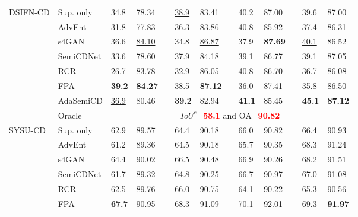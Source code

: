 \documentclass[lang=chs, degree=master, blindreview=false, adobe=false]{yanputhesis}
\begin{document}
\begin{table}[H]
{\begin{tabular}{p{20mm}p{25mm}p{8mm}p{8mm}cp{8mm}p{8mm}cp{8mm}p{8mm}cp{8mm}p{8mm}}
      \bottomrule
      \multirow{8}{*}{DSIFN-CD}
      & Sup. only   &   34.8 & 78.34 && \underline{38.9} & 83.41 && 40.2 & 87.00 && 39.6 & 87.00 \\ %
      & AdvEnt\cite{vu2019advent}& 31.8 & 77.83 && 36.3 & 83.86 && 40.8 & 85.92 && 37.4 & 86.31 \\ %
      & s4GAN\cite{mittal2019semi}& 36.6 & \underline{84.10} && 34.8 & \underline{86.87} && 37.9 & \cellcolor{mycyan}\textbf{87.69} && \underline{40.1} & 86.52 \\
      & SemiCDNet\cite{peng2021SemiCDNet} & 33.6 & 78.60 && 37.9 & 84.18 && 39.1 & 86.77 && 39.1 & \underline{87.05} \\ %
      & RCR\cite{bandara2022RCR}& 26.7 & 83.78 && 32.9 & 86.05 && 40.8 & 86.70 && 36.7 & 86.08 \\
      & FPA\cite{Zhang2023FPA}& \cellcolor{mycyan}\textbf{39.2} & \cellcolor{mycyan}\textbf{84.27} && 38.5 & \cellcolor{mycyan}\textbf{87.12} && 36.0 & \underline{87.41} && 35.8 & 86.50 \\
      \multirow{-8}{*}{\cellcolor{white}}& \cellcolor{white}AdaSemiCD   &   \cellcolor{white}\underline{36.9} & \cellcolor{white}80.46 && \cellcolor{mycyan}\textbf{39.2} & 82.94 && \cellcolor{mycyan}\textbf{41.1} & 85.45 && \cellcolor{mycyan}\textbf{45.1} & \cellcolor{mycyan}\textbf{87.12} \\%
      \cline{2-13}
      & Oracle & \multicolumn{11}{c}{$ IoU^c$=\textcolor{red}{\bf 58.1} and OA=\textcolor{red}{\bf 90.82}} \\
      \bottomrule
      \multirow{8}{*}{SYSU-CD}
      & Sup. only   &   62.9 & 89.57 && 64.4 & 90.18 && 66.0 & 90.82 && 66.4 & 90.93 \\ %
      & AdvEnt\cite{vu2019advent}& 61.2 & 89.36 && 64.5 & 90.18 && 65.7 & 90.35 && 68.3 & 91.24 \\ %
      & s4GAN\cite{mittal2019semi}& 64.4 & 90.02 && 66.5 & 90.48 && 66.9 & 90.26 && 68.2 & 91.51 \\
      & SemiCDNet\cite{peng2021SemiCDNet} & 61.7 & 89.32 && 64.8 & 90.25 && 66.7 & 90.97 && 67.0 & 91.08 \\ %
      & RCR\cite{bandara2022RCR}& 62.5 & 89.76 && 66.0 & 90.75 && 64.1 & 90.22 && 65.3 & 90.56 \\
      & FPA\cite{Zhang2023FPA}& \cellcolor{mycyan}\textbf{67.7} & 90.95 && \underline{68.3} & \underline{91.09} && \underline{70.1} & \underline{92.01} && \underline{69.3} & \cellcolor{mycyan}\textbf{91.97} \\

\end{tabular}}
\end{table}
\end{document}
